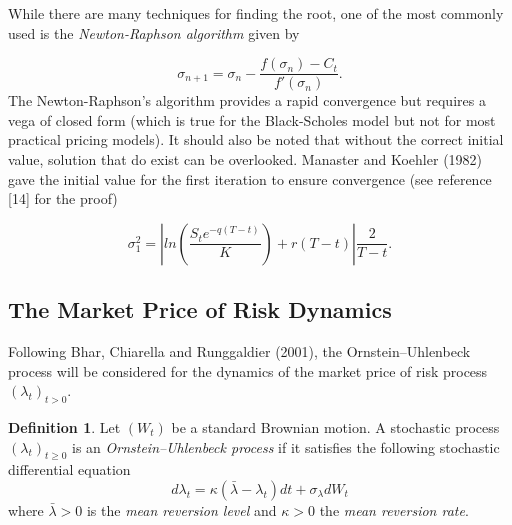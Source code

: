 \documentclass{article}
\theoremstyle{definition}
\newtheorem{definition}[thm]{Definition}
\theoremstyle{remark}
\newtheorem{remark}[thm]{Remark}
\newcommand{\process}[1]{\ensuremath{(#1_t)_{t>0}}}
\begin{document}

While there are many techniques for finding the root, one of the most commonly used is the \textit{Newton-Raphson algorithm} given by

\begin{equation*}
\sigma_{n+1}=\sigma_{n}-\frac{f(\sigma_n)-C_t}{f'(\sigma_n)}.
\end{equation*}
The Newton-Raphson's algorithm provides a rapid convergence but requires a vega of closed form (which is true for the Black-Scholes model but not for most practical pricing models). It should also be noted that without the correct initial value, solution that do exist can be overlooked. Manaster and Koehler (1982) gave the initial value for the first iteration to ensure convergence (see reference [14] for the proof)

\begin{equation*}
\sigma_1^2=\left| ln\left( \frac{S_te^{-q(T-t)}}{K} \right) +r(T-t)\right|\frac{2}{T-t}.
\end{equation*}








\subsection{The Market Price of Risk Dynamics}
Following Bhar, Chiarella and Runggaldier (2001), the Ornstein--Uhlenbeck process will be considered for the dynamics of the  market price of risk process \process{\lambda}.

\begin{definition}
Let $(W_t)$ be a standard Brownian motion. A stochastic process $(\lambda_t)_{t\geq 0}$ is an  \emph{Ornstein--Uhlenbeck process} if it satisfies the following stochastic differential equation
\begin{equation}
\boxed{
d\lambda_t=\kappa(\bar{\lambda}-\lambda_t)dt+\sigma_\lambda dW_t
}
\end{equation}
where $\bar{\lambda}>0$ is the \emph{mean reversion level} and $\kappa>0$ the \emph{mean reversion rate}.
\end{definition}
\end{document}
